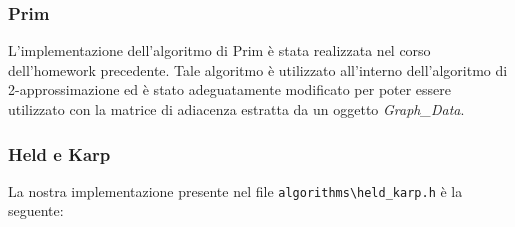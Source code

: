 \documentclass[]{article}
\begin{document}
\subsubsection{Prim}
L'implementazione dell'algoritmo di Prim è stata realizzata nel corso dell'homework precedente. Tale algoritmo è utilizzato all'interno dell'algoritmo di 2-approssimazione ed è stato adeguatamente modificato per poter essere utilizzato con la matrice di adiacenza estratta da un oggetto \textit{Graph\_Data}.
\subsubsection{Held e Karp}
\begin{flushleft}
La nostra implementazione presente nel file \verb|algorithms\held_karp.h| è la seguente:
\lstset{language=c++, style=mystyle}



\end{flushleft}
\end{document}
